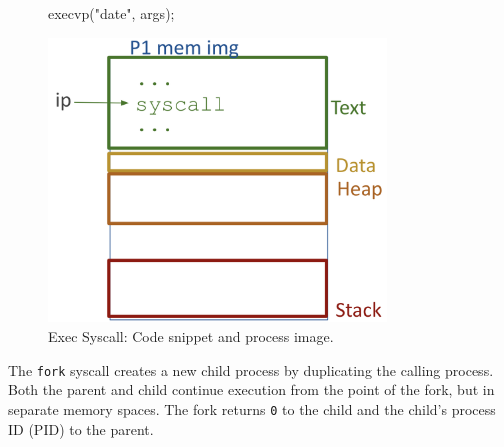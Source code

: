 \documentclass[../../compsys.tex]{subfiles}
\begin{document}
\begin{figure}[htp]
  \centering
  \begin{minipage}[b]{0.45\textwidth}
    \begin{cc}
execvp("date", args);











    \end{cc}
  \end{minipage}
  \hfill
  \vline
  \hfill
  \begin{minipage}[b]{0.45\textwidth}
    \centering
    \includegraphics[width=0.8\textwidth]{chapters/L3/images/exec.png}
  \end{minipage}
  \caption{Exec Syscall: Code snippet and process image.}
\end{figure}

\begin{definition}
The \texttt{fork} syscall creates a new child process by duplicating the calling process. Both the parent and child continue execution from the point of the fork, but in separate memory spaces. The fork returns \texttt{0} to the child and the child's process ID (PID) to the parent.
\end{definition}
\end{document}
